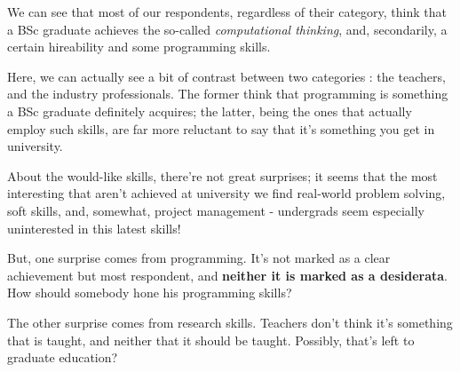\documentclass{sigchi}
\begin{document}
We can see that most of our respondents, regardless of their category, think that a BSc graduate achieves the so-called \textit{computational thinking}, and, secondarily, a certain hireability and some programming skills. 

Here, we can actually see a bit of contrast between two categories : the teachers, and the industry professionals. The former think that programming is something a BSc graduate definitely acquires; the latter, being the ones that actually employ such skills, are far more reluctant to say that it's something you get in university.

About the would-like skills, there're not great surprises; it seems that the most interesting that aren't achieved at university we find real-world problem solving, soft skills, and, somewhat, project management - undergrads seem especially uninterested in this latest skills!

But, one surprise comes from programming. It's not marked as a clear achievement but most respondent, and \textbf{neither it is marked as a desiderata}. How should somebody hone his programming skills?

The other surprise comes from research skills. Teachers don't think it's something that is taught, and neither that it should be taught. Possibly, that's left to graduate education?\newline
\end{document}
